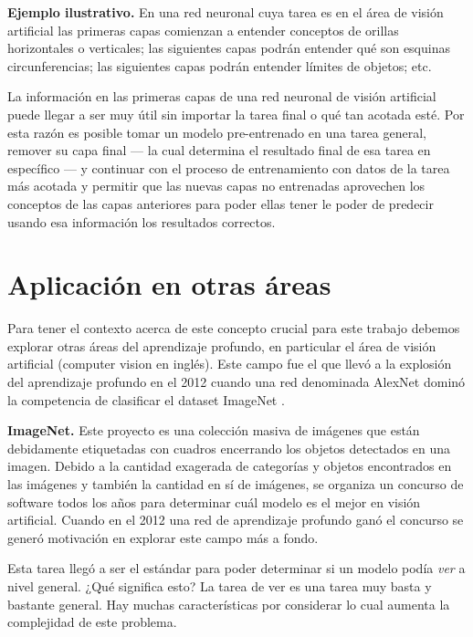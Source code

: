 \textbf{Ejemplo ilustrativo.} En una red neuronal cuya tarea es en el área de visión artificial las primeras capas comienzan a entender conceptos de orillas horizontales o verticales; las siguientes capas podrán entender qué son esquinas circunferencias; las siguientes capas podrán entender límites de objetos; etc.

La información en las primeras capas de una red neuronal de visión artificial puede llegar a ser muy útil sin importar la tarea final o qué tan acotada esté. Por esta razón es posible tomar un modelo pre-entrenado en una tarea general, remover su capa final --- la cual determina el resultado final de esa tarea en específico --- y continuar con el proceso de entrenamiento con datos de la tarea más acotada y permitir que las nuevas capas no entrenadas aprovechen los conceptos de las capas anteriores para poder ellas tener le poder de predecir usando esa información los resultados correctos.



\section{Aplicación en otras áreas}
Para tener el contexto acerca de este concepto crucial para este trabajo debemos explorar otras áreas del aprendizaje profundo, en particular el área de visión artificial (computer vision en inglés). Este campo fue el que llevó a la explosión del aprendizaje profundo en el 2012 cuando una red denominada AlexNet dominó la competencia de clasificar el dataset ImageNet \parencite{deng2009imagenet}.

\textbf{ImageNet.} Este proyecto es una colección masiva de imágenes que están debidamente etiquetadas con cuadros encerrando los objetos detectados en una imagen. Debido a la cantidad exagerada de categorías y objetos encontrados en las imágenes y también la cantidad en sí de imágenes, se organiza un concurso de software todos los años para determinar cuál modelo es el mejor en visión artificial. Cuando en el 2012 una red de aprendizaje profundo ganó el concurso se generó motivación en explorar este campo más a fondo.

Esta tarea llegó a ser el estándar para poder determinar si un modelo podía \emph{ver} a nivel general. ¿Qué significa esto? La tarea de ver es una tarea muy basta y bastante general. Hay muchas características por considerar lo cual aumenta la complejidad de este problema.


